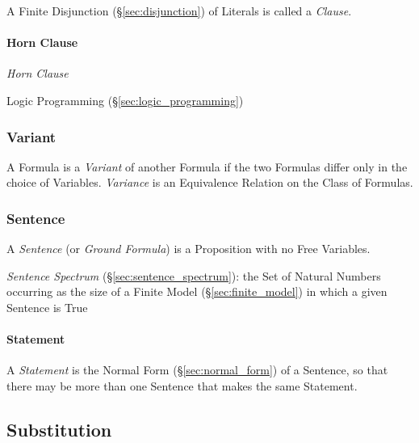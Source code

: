 A Finite Disjunction (\S\ref{sec:disjunction}) of Literals is called a
\emph{Clause}.



\paragraph{Horn Clause}\label{sec:horn_clause}\hfill

\emph{Horn Clause}

\fist Logic Programming (\S\ref{sec:logic_programming})



\subsubsection{Variant}\label{sec:variant}

A Formula is a \emph{Variant} of another Formula if the two Formulas
differ only in the choice of Variables. \emph{Variance} is an
Equivalence Relation on the Class of Formulas.



\subsubsection{Sentence}\label{sec:sentence}

A \emph{Sentence} (or \emph{Ground Formula}) is a Proposition with no
Free Variables.

\emph{Sentence Spectrum} (\S\ref{sec:sentence_spectrum}): the Set of Natural
Numbers occurring as the size of a Finite Model
(\S\ref{sec:finite_model}) in which a given Sentence is True



\paragraph{Statement}\label{sec:statement}\hfill

A \emph{Statement} is the Normal Form (\S\ref{sec:normal_form}) of a
Sentence, so that there may be more than one Sentence that makes the
same Statement.



\subsection{Substitution}\label{sec:substitution}

